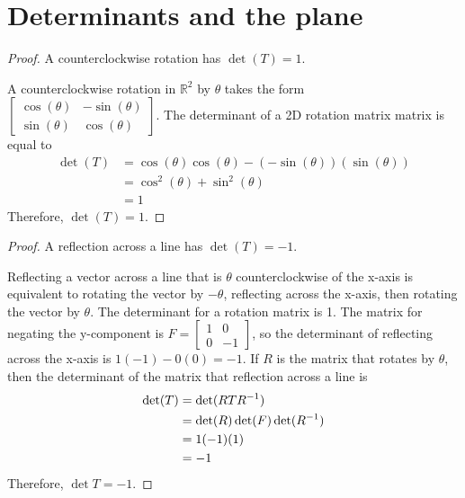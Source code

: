 \section{Determinants and the plane}

\begin{proof}A counterclockwise rotation has $\det(T) = 1$.\gap

    A counterclockwise rotation in $\mathbb{R}^2$
    by $\theta$ takes the form
    $\begin{bmatrix}
        \cos(\theta) & -\sin(\theta)\\
        \sin(\theta) & \cos(\theta)
    \end{bmatrix}.$
    The determinant of a 2D rotation matrix matrix is equal to
    \begin{align}
        \det(T)
        &= \cos(\theta)\cos(\theta)-(-\sin(\theta))(\sin(\theta))\\
        &= \cos^2(\theta) + \sin^2(\theta)\\
        &= 1
    \end{align}
    Therefore, $\det(T) = 1$.
\end{proof}
    
\begin{proof} A reflection across a line has $\det(T) = -1$.\gap

    Reflecting a vector across a line that is $\theta$ 
    counterclockwise of the x-axis is equivalent to rotating 
    the vector by $-\theta$, 
    reflecting across the x-axis,
    then rotating the vector by $\theta$.
    The determinant for a rotation matrix is 1.
    The matrix for negating the y-component is
    $F =
    \begin{bmatrix}
        1 & 0\\
        0 & -1
    \end{bmatrix}$, so
    the determinant of reflecting across the x-axis
    is $1(-1) - 0(0) = -1$.
    If $R$ is the matrix that rotates by $\theta$,
    then the determinant of the matrix 
    that reflection across a line is
    \begin{align}
        \det(T)
        &= \det(RTR^{-1})\\
        &= \det(R)\det(F)\det(R^{-1})\\
        &= 1(-1)(1)\\
        &= -1
    \end{align}
    Therefore, $\det T = -1$.
\end{proof}